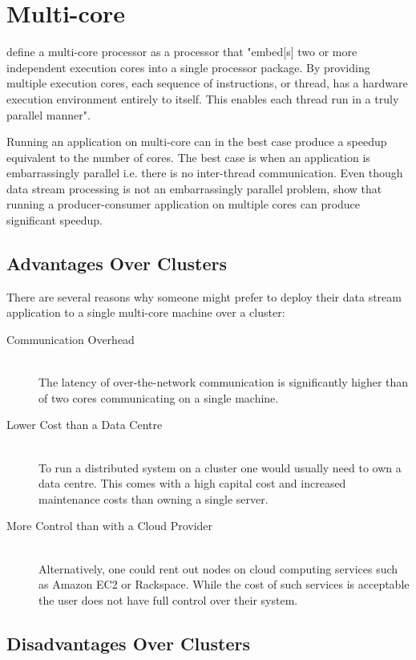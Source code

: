 \documentclass[bsc,logo,frontabs,twoside,singlespacing,normalheadings,parskip]{infthesis}\usepackage[]{graphicx}\usepackage[]{color}
\begin{document}
\section{Multi-core}
\label{sec:multicore}

\citet{akhter2006multi} define a multi-core processor as a processor that "embed[s] two or more independent execution cores into a single processor package. By providing multiple execution cores, each sequence of instructions, or thread, has a hardware execution environment entirely to itself. This enables each thread run in a truly parallel manner".

Running an application on multi-core can in the best case produce a speedup equivalent to the number of cores. The best case is when an application is embarrassingly parallel i.e. there is no inter-thread communication. Even though data stream processing is not an embarrassingly parallel problem, \citet{Prat-Perez:2013:PPM:2450027.2450037} show that running a producer-consumer application on multiple cores can produce significant speedup.

\subsection{Advantages Over Clusters}

There are several reasons why someone might prefer to deploy their data stream application to a single multi-core machine over a cluster:

\begin{description}
	\item[Communication Overhead] \hfill \\
	The latency of over-the-network communication is significantly higher than of two cores communicating on a single machine.
	\item[Lower Cost than a Data Centre] \hfill \\
	To run a distributed system on a cluster one would usually need to own a data centre. This comes with a high capital cost and increased maintenance costs than owning a single server.
	\item[More Control than with a Cloud Provider] \hfill \\
	Alternatively, one could rent out nodes on cloud computing services such as Amazon EC2 or Rackspace. While the cost of such services is acceptable the user does not have full control over their system.
\end{description}

\subsection{Disadvantages Over Clusters}
\end{document}
